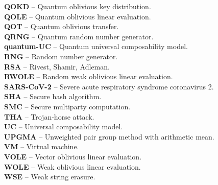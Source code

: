 \textbf{QOKD} -- Quantum oblivious key distribution.
\vspace{0.5cm}\\
\textbf{QOLE} -- Quantum oblivious linear evaluation.
\vspace{0.5cm}\\
\textbf{QOT} -- Quantum oblivious transfer.
\vspace{0.5cm}\\
\textbf{QRNG} -- Quantum random number generator.
\vspace{0.5cm}\\
\textbf{quantum-UC} -- Quantum universal composability model.
\vspace{0.5cm}\\
\textbf{RNG} -- Random number generator.
\vspace{0.5cm}\\
\textbf{RSA} -- Rivest, Shamir, Adleman.
\vspace{0.5cm}\\
\textbf{RWOLE} -- Random weak oblivious linear evaluation.
\vspace{0.5cm}\\
\textbf{SARS-CoV-2} -- Severe acute respiratory syndrome coronavirus 2.
\vspace{0.5cm}\\
\textbf{SHA} -- Secure hash algorithm.
\vspace{0.5cm}\\
\textbf{SMC} -- Secure multiparty computation.
\vspace{0.5cm}\\
\textbf{THA} -- Trojan-horse attack.
\vspace{0.5cm}\\
\textbf{UC} -- Universal composability model.
\vspace{0.5cm}\\
\textbf{UPGMA} -- Unweighted pair group method with arithmetic mean.
\vspace{0.5cm}\\
\textbf{VM} -- Virtual machine.
\vspace{0.5cm}\\
\textbf{VOLE} -- Vector oblivious linear evaluation.
\vspace{0.5cm}\\
\textbf{WOLE} -- Weak oblivious linear evaluation.
\vspace{0.5cm}\\
\textbf{WSE} -- Weak string erasure.
\vspace{0.5cm}\\








